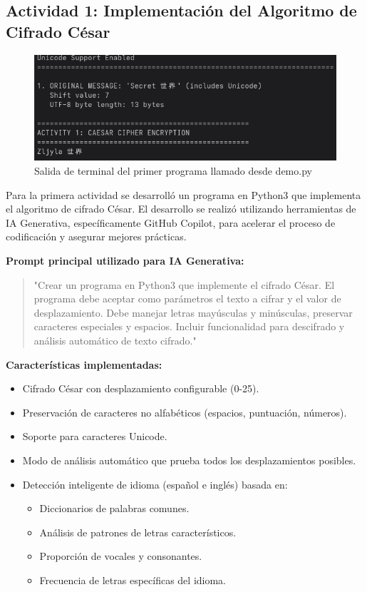 \documentclass[letter,12pt]{article}
\begin{document}
\subsection{Actividad 1: Implementación del Algoritmo de Cifrado César}
\begin{figure}
    \centering
    \includegraphics[width=1\linewidth]{actividades/Captura desde 2025-09-04 23-00-32.png}
    \caption{Salida de terminal del primer programa llamado desde demo.py}
    \label{terminal1}
\end{figure}
Para la primera actividad se desarrolló un programa en Python3 que implementa el algoritmo de cifrado César. El desarrollo se realizó utilizando herramientas de IA Generativa, específicamente GitHub Copilot, para acelerar el proceso de codificación y asegurar mejores prácticas.

\textbf{Prompt principal utilizado para IA Generativa:}
\begin{quote}
"Crear un programa en Python3 que implemente el cifrado César. El programa debe aceptar como parámetros el texto a cifrar y el valor de desplazamiento. Debe manejar letras mayúsculas y minúsculas, preservar caracteres especiales y espacios. Incluir funcionalidad para descifrado y análisis automático de texto cifrado."
\end{quote}

\textbf{Características implementadas:}
\begin{itemize}
    \item Cifrado César con desplazamiento configurable (0-25).
    \item Preservación de caracteres no alfabéticos (espacios, puntuación, números).
    \item Soporte para caracteres Unicode.
    \item Modo de análisis automático que prueba todos los desplazamientos posibles.
    \item Detección inteligente de idioma (español e inglés) basada en:
    \begin{itemize}
        \item Diccionarios de palabras comunes.
        \item Análisis de patrones de letras característicos.
        \item Proporción de vocales y consonantes.
        \item Frecuencia de letras específicas del idioma.
    \end{itemize}
\end{itemize}
\end{document}
